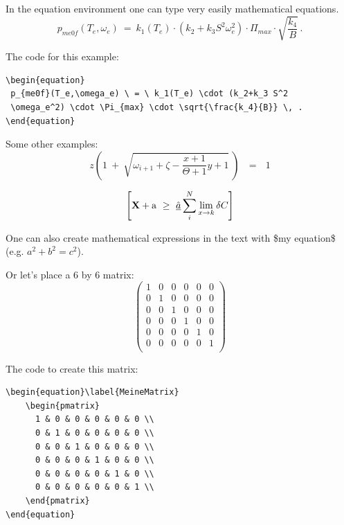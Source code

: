 In the equation environment one can type very easily mathematical equations.
\begin{equation}
 p_{me0f}(T_e,\omega_e) \ = \ k_1(T_e) \cdot (k_2+k_3 S^2
 \omega_e^2) \cdot \Pi_{max} \cdot \sqrt{\frac{k_4}{B}} \, .
\end{equation}

The code for this example:
\begin{verbatim}
\begin{equation}
 p_{me0f}(T_e,\omega_e) \ = \ k_1(T_e) \cdot (k_2+k_3 S^2
 \omega_e^2) \cdot \Pi_{max} \cdot \sqrt{\frac{k_4}{B}} \, .
\end{equation}
\end{verbatim}

Some other examples:
\[
z \left( 1 \ +\ \sqrt{\omega_{i+1} + \zeta -\frac{x+1}{\Theta +1} y + 1} 
\ \right)
\ \ \ =\ \ \ 1
\]


\begin{equation}
\left[
{\bf X} + {\rm a} \ \geq\ 
\underline{\hat a} \sum_i^N \lim_{x \rightarrow k} \delta C
\right]
\end{equation}

One can also create mathematical expressions in the text with \$my equation\$ (e.g. $a^2+b^2=c^2$).
\newline

Or let's place a 6 by 6 matrix:
\begin{equation}\label{MeineMatrix}
    \begin{pmatrix}
      1 & 0 & 0 & 0 & 0 & 0 \\
      0 & 1 & 0 & 0 & 0 & 0 \\
      0 & 0 & 1 & 0 & 0 & 0 \\
      0 & 0 & 0 & 1 & 0 & 0 \\
      0 & 0 & 0 & 0 & 1 & 0 \\
      0 & 0 & 0 & 0 & 0 & 1 \\
    \end{pmatrix}
\end{equation}

The code to create this matrix:
\begin{verbatim}
\begin{equation}\label{MeineMatrix}
    \begin{pmatrix}
      1 & 0 & 0 & 0 & 0 & 0 \\
      0 & 1 & 0 & 0 & 0 & 0 \\
      0 & 0 & 1 & 0 & 0 & 0 \\
      0 & 0 & 0 & 1 & 0 & 0 \\
      0 & 0 & 0 & 0 & 1 & 0 \\
      0 & 0 & 0 & 0 & 0 & 1 \\
    \end{pmatrix}
\end{equation}
\end{verbatim}



